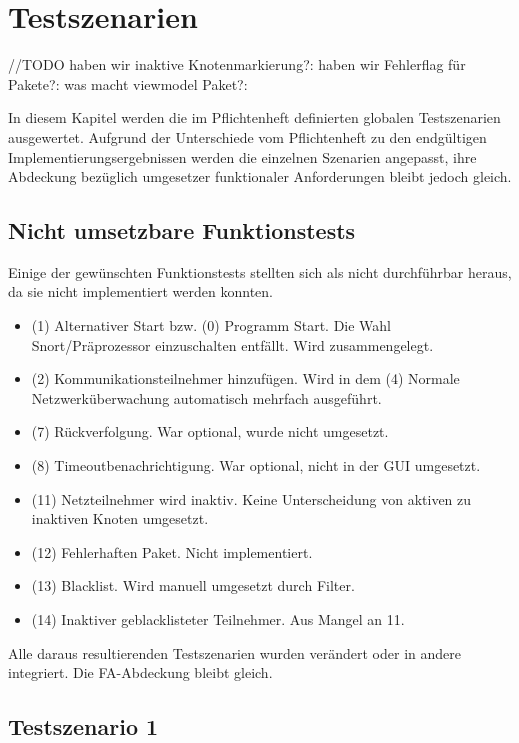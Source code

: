 \chapter{Testszenarien}
//TODO
haben wir inaktive Knotenmarkierung?:
haben wir Fehlerflag für Pakete?:
was macht viewmodel Paket?:




In diesem Kapitel werden die im Pflichtenheft definierten globalen Testszenarien ausgewertet. Aufgrund der Unterschiede vom Pflichtenheft zu den endgültigen Implementierungsergebnissen werden die einzelnen Szenarien angepasst, ihre Abdeckung bezüglich umgesetzer funktionaler Anforderungen bleibt jedoch gleich.

\section{Nicht umsetzbare Funktionstests}

Einige der gewünschten Funktionstests stellten sich als nicht durchführbar heraus, da sie nicht implementiert werden konnten.

\begin{itemize}
  \item (1)  Alternativer Start bzw. (0) Programm Start. Die Wahl Snort/Präprozessor einzuschalten entfällt. Wird zusammengelegt.
  \item (2)  Kommunikationsteilnehmer hinzufügen. Wird in dem (4) Normale Netzwerküberwachung automatisch mehrfach ausgeführt.
  \item (7)  Rückverfolgung. War optional, wurde nicht umgesetzt.
  \item (8)  Timeoutbenachrichtigung. War optional, nicht in der GUI umgesetzt.
  \item (11) Netzteilnehmer wird inaktiv. Keine Unterscheidung von aktiven zu inaktiven Knoten umgesetzt.
  \item (12) Fehlerhaften Paket. Nicht implementiert.
  \item (13) Blacklist. Wird manuell umgesetzt durch Filter.
  \item (14) Inaktiver geblacklisteter Teilnehmer. Aus Mangel an 11.
\end{itemize}

Alle daraus resultierenden Testszenarien wurden verändert oder in andere integriert. Die FA-Abdeckung bleibt gleich.

\section{Testszenario 1}

